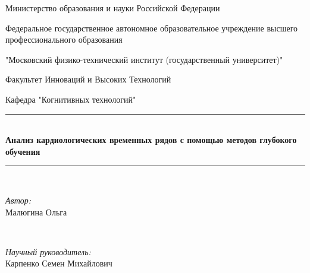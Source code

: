 \begin{titlepage}

\newcommand{\HRule}{\rule{\linewidth}{0.5mm}} %

\center %
 

Министерство образования и науки Российской Федерации

Федеральное государственное автономное образовательное учреждение высшего профессионального образования

"Московский физико-технический институт (государственный университет)"

Факультет Инноваций и Высоких Технологий

Кафедра "Когнитивных технологий" \\[1.5cm]



\HRule \\[0.4cm]
{ \huge \bfseries Анализ кардиологических временных рядов с	помощью методов глубокого обучения}\\[0.4cm] %
\HRule \\[1.5cm]
 

\begin{minipage}{0.4\textwidth}
\begin{flushleft} \large
\emph{Автор:}\\
Малюгина Ольга %
\end{flushleft}
\end{minipage}
~
\begin{minipage}{0.4\textwidth}
\begin{flushright} \large
\emph{Научный руководитель:} \\
Карпенко Семен Михайлович%
\end{flushright}
\end{minipage}\\[4cm]




\end{titlepage}
